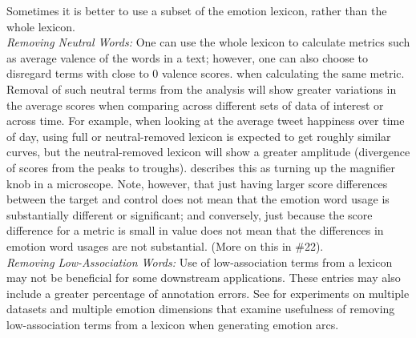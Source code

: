 \documentclass[11pt]{article}
\newcommand{\sm}[1]{{\color{black} #1}} %
\begin{document}
 Sometimes it is better to use a subset of the emotion lexicon, rather than the whole lexicon.\\[3pt] %
\noindent \textit{Removing Neutral Words:} 
One can use the whole lexicon to calculate 
metrics such as average valence of the words in a text;
however, one can also choose to disregard terms with close to 0 valence scores. %
when calculating the same metric.
Removal of such neutral terms from the analysis will show greater variations in the average scores when comparing across different sets of data of interest  
or across time. For example, when looking at the average tweet happiness over time of day, using full or neutral-removed lexicon is expected to get roughly similar curves, but the neutral-removed lexicon will show a greater amplitude (divergence of scores from the peaks to troughs).
\cite{dodds2011temporal} describes this as turning up the magnifier knob in a microscope.
\sm{Note, however, that just having larger score differences between the target and control does not mean that the emotion word usage is substantially different or significant; and conversely, just because the score difference for a metric is small in value does not mean that the differences in emotion word usages are not substantial. %
(More on this in \#22).}\\[3pt]
\noindent \textit{Removing Low-Association Words:} Use of low-association terms from a lexicon may not be beneficial for some downstream applications. These entries may also include a greater percentage of annotation errors.
See  for experiments on multiple datasets and multiple emotion dimensions that examine usefulness of removing low-association terms from a lexicon when generating emotion arcs.\\[3pt]
\end{document}
